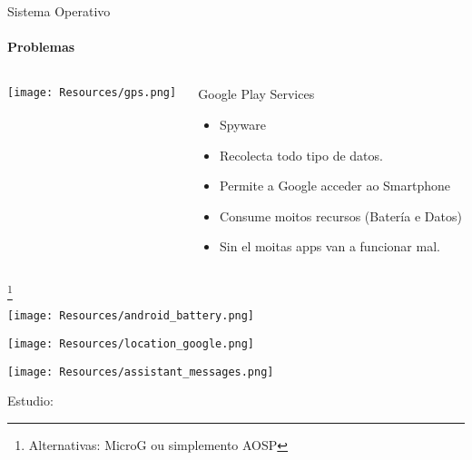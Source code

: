 \documentclass{beamer}
\begin{document}
\begin{frame}{Sistema Operativo}
  \framesubtitle{Problemas}

  \begin{columns}
    \begin{column}{0.5\textwidth}
      \texttt{[image: Resources/gps.png]}

    \end{column}

    \begin{column}{0.4\textwidth}
      \begin{block}{Google Play Services}
        \begin{itemize}
          \item Spyware
          \item Recolecta todo tipo de datos.
          \item Permite a Google acceder ao Smartphone
          \item Consume moitos recursos (Batería e Datos)
          \item Sin el moitas apps van a funcionar mal.
        \end{itemize}
      \end{block}

    \end{column}

  \end{columns}

  \footnote{Alternativas: MicroG ou simplemento AOSP}

\end{frame}


\begin{frame}
  \texttt{[image: Resources/android\_battery.png]}
\end{frame}

\begin{frame}
  \texttt{[image: Resources/location\_google.png]}
\end{frame}

\begin{frame}
  \texttt{[image: Resources/assistant\_messages.png]}
\end{frame}

\begin{frame}

  Estudio:\quad
  \qquad


\end{frame}
\end{document}
